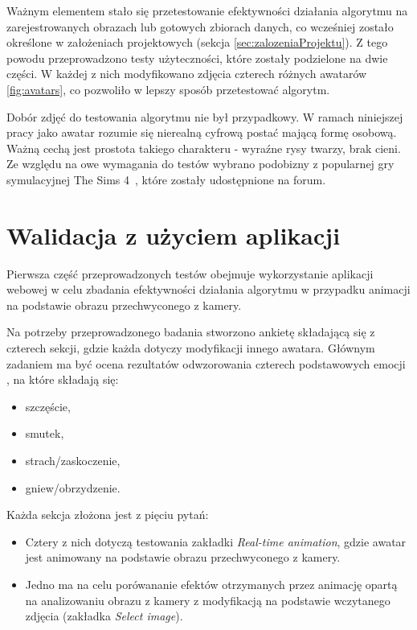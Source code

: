 Ważnym elementem stało się przetestowanie efektywności działania algorytmu na zarejestrowanych obrazach lub gotowych zbiorach danych, co wcześniej zostało określone w założeniach projektowych (sekcja \ref{sec:zalozeniaProjektu}). Z tego powodu przeprowadzono testy użyteczności, które zostały podzielone na dwie części. W każdej z nich modyfikowano zdjęcia czterech różnych awatarów \ref{fig:avatars}, co pozwoliło w lepszy sposób przetestować algorytm.

Dobór zdjęć do testowania algorytmu nie był przypadkowy. W ramach niniejszej pracy jako awatar rozumie się nierealną cyfrową postać mającą formę osobową. Ważną cechą jest prostota takiego charakteru - wyraźne rysy twarzy, brak cieni. Ze względu na owe wymagania do testów wybrano podobizny z popularnej gry symulacyjnej The Sims 4~\cite{avatars}, które zostały udostępnione na forum.


\section{Walidacja z użyciem aplikacji}
Pierwsza część przeprowadzonych testów obejmuje wykorzystanie aplikacji webowej w celu zbadania efektywności działania algorytmu w przypadku animacji na podstawie obrazu przechwyconego z kamery. 

Na potrzeby przeprowadzonego badania stworzono ankietę składającą się z czterech sekcji, gdzie każda dotyczy modyfikacji innego awatara. Głównym zadaniem ma być ocena rezultatów odwzorowania czterech podstawowych emocji \cite{emotions}, na które składają się:

\begin{itemize}
    \item szczęście,
    \item smutek,
    \item strach/zaskoczenie,
    \item gniew/obrzydzenie.
\end{itemize}

Każda sekcja złożona jest z pięciu pytań:
\begin{itemize}
    \item Cztery z nich dotyczą testowania zakładki \textit{Real-time animation}, gdzie awatar jest animowany na podstawie obrazu przechwyconego z kamery.
    \item Jedno ma na celu porówananie efektów otrzymanych przez animację opartą na analizowaniu obrazu z kamery z modyfikacją na podstawie wczytanego zdjęcia (zakładka \textit{Select image}).
\end{itemize}

